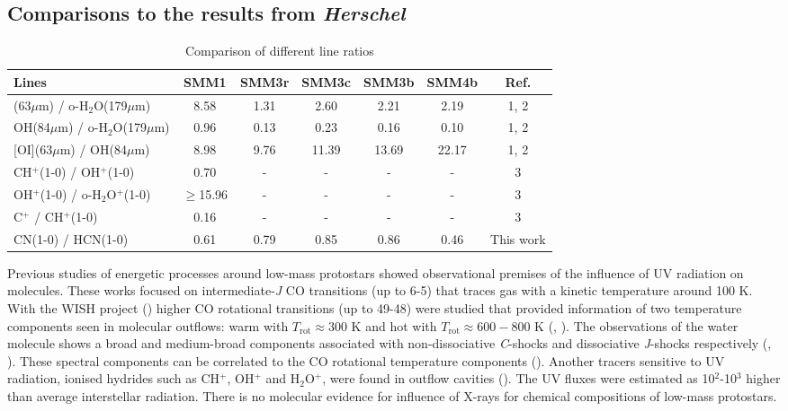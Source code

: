 \documentclass{aa}
\begin{document}
\subsection{Comparisons to the results from \textit{Herschel}}
\label{subsection:herschel}


\begin{table*} 
\caption{Comparison of different line ratios} 
\centering %
\label{line_ratios} 

\begin{tabular}{l c c c c c c} 
\hline\hline 
Lines & SMM1 & SMM3r & SMM3c & SMM3b & SMM4b & Ref. \\ 
\hline 
[OI](63$\mu$m) / o-H$_2$O(179$\mu$m) & 8.58 & 1.31 & 2.60 & 2.21 & 2.19 & 1, 2 \\ 
OH(84$\mu$m) / o-H$_2$O(179$\mu$m) & 0.96 & 0.13 & 0.23 & 0.16 & 0.10 & 1, 2 \\ 
\mbox{[OI](63$\mu$m)} / OH(84$\mu$m) & 8.98 & 9.76 & 11.39 & 13.69 & 22.17 & 1, 2 \\
CH$^+$(1-0) / OH$^+$(1-0) & 0.70 & - & - & - & - & 3\\ 
OH$^+$(1-0) / o-H$_2$O$^+$(1-0) & $\geq$15.96 & - & - & - & -& 3\\
C$^+$ / CH$^+$(1-0) & 0.16 & - & - & - & -& 3\\
CN(1-0) / HCN(1-0) & 0.61 & 0.79 & 0.85 & 0.86 & 0.46 & This work\\
\hline \end{tabular} 
\end{table*}


Previous studies of energetic processes around low-mass protostars showed observational premises of
the influence of UV radiation on molecules. These works focused on intermediate-\textit{J} CO
transitions (up to 6-5) that traces gas with a kinetic temperature around 100 K. With the WISH project (\citealt{vDi11}) higher CO
rotational transitions (up to 49-48) were studied that provided information of two temperature
components seen in molecular outflows: warm with $T_\mathrm{rot} \approx 300$ K and hot with
$T_\mathrm{rot} \approx 600-800$ K (\citealt{Kar13}, \citealt{Gre13}). The observations of the water
molecule shows a broad and medium-broad components associated with non-dissociative \textit{C}-shocks and dissociative \textit{J}-shocks respectively (\citealt{Kri13}, \citealt{Mot14}). These
spectral components can be correlated to the CO rotational temperature components (\citealt{Kri17}).
Another tracers sensitive to UV radiation, ionised hydrides such as CH$^+$, OH$^+$ and H$_2$O$^+$,
were found in outflow cavities (\citealt{Ben16}). The UV fluxes were estimated as 10$^2$-10$^3$
higher than average interstellar radiation. There is no molecular evidence for influence of X-rays
for chemical compositions of low-mass protostars.
\end{document}
